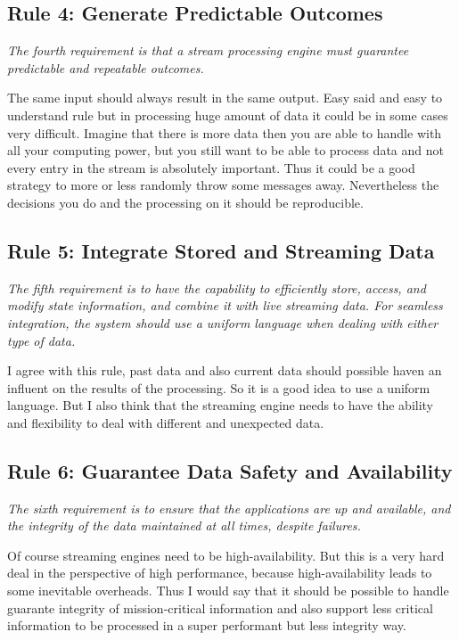 \subsection{Rule 4: Generate Predictable Outcomes}
\textit{The fourth requirement is that a stream processing engine
        must guarantee predictable and repeatable outcomes.}

\medskip
The same input should always result in the same output.
Easy said and easy to understand rule but in processing huge amount of data it could be in some cases very difficult.
Imagine that there is more data then you are able to handle with all your computing power,
but you still want to be able to process data and not every entry in the stream is absolutely important.
Thus it could be a good strategy to more or less randomly throw some messages away.
Nevertheless the decisions you do and the processing on it should be reproducible.

\subsection{Rule 5: Integrate Stored and Streaming Data}
\textit{The fifth requirement is to have the capability to efficiently
        store, access, and modify state information, and combine it
        with live streaming data. For seamless integration, the
        system should use a uniform language when dealing with
        either type of data.}

\medskip
I agree with this rule, past data and also current data should possible haven an influent
on the results of the processing. So it is a good idea to use a uniform language.
But I also think that the streaming engine needs to have the ability and flexibility to deal with different
and unexpected data.

\newpage
\subsection{Rule 6: Guarantee Data Safety and Availability}
\textit{The sixth requirement is to ensure that the applications are
        up and available, and the integrity of the data maintained at
        all times, despite failures.}

\medskip
Of course streaming engines need to be high-availability.
But this is a very hard deal in the perspective of high performance,
because high-availability leads to some inevitable overheads.
Thus I would say that it should be possible to handle guarante integrity of mission-critical information
and also support less critical information to be processed in a super performant but less integrity way.

